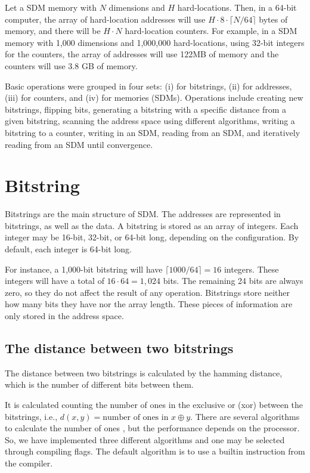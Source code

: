 Let a SDM memory with $N$ dimensions and $H$ hard-locations. Then, in a 64-bit computer, the array of hard-location addresses will use $H \cdot 8 \cdot \lceil N/64 \rceil$ bytes of memory, and there will be $H \cdot N$ hard-location counters. For example, in a SDM memory with 1,000 dimensions and 1,000,000 hard-locations, using 32-bit integers for the counters, the array of addresses will use 122MB of memory and the counters will use 3.8 GB of memory.

Basic operations were grouped in four sets: (i) for bitstrings, (ii) for addresses, (iii) for counters, and (iv) for memories (SDMs). Operations include creating new bitstrings, flipping bits, generating a bitstring with a specific distance from a given bitstring, scanning the address space using different algorithms, writing a bitstring to a counter, writing in an SDM, reading from an SDM, and iteratively reading from an SDM until convergence.


\section{Bitstring}

Bitstrings are the main structure of SDM. The addresses are represented in bitstrings, as well as the data. A bitstring is stored as an array of integers. Each integer may be 16-bit, 32-bit, or 64-bit long, depending on the configuration. By default, each integer is 64-bit long.

For instance, a 1,000-bit bitstring will have $\lceil 1000/64 \rceil = 16$ integers. These integers will have a total of $16 \cdot 64 = 1,024$ bits. The remaining 24 bits are always zero, so they do not affect the result of any operation. Bitstrings store neither how many bits they have nor the array length. These pieces of information are only stored in the address space.


\subsection{The distance between two bitstrings}

The distance between two bitstrings is calculated by the hamming distance, which is the number of different bits between them.

It is calculated counting the number of ones in the exclusive or (xor) between the bitstrings, i.e., $d(x, y) = \text{number of ones in } x \oplus y$. There are several algorithms to calculate the number of ones \citep{warren2013hacker}, but the performance depends on the processor. So, we have implemented three different algorithms and one may be selected through compiling flags. The default algorithm is to use a builtin instruction from the compiler.


